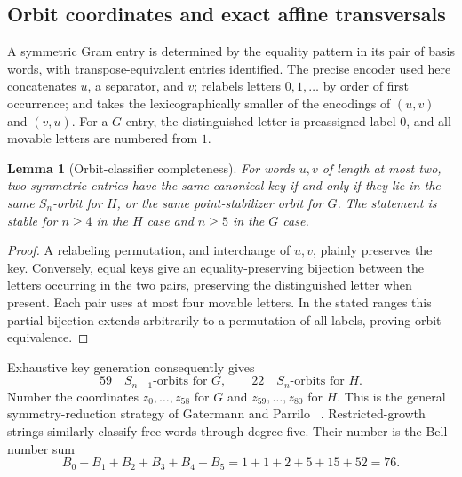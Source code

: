 \documentclass[11pt]{article}
\newtheorem{lemma}[theorem]{Lemma}
\begin{document}
\subsection{Orbit coordinates and exact affine transversals}

A symmetric Gram entry is determined by the equality pattern in its pair of
basis words, with transpose-equivalent entries identified.  The precise
encoder used here concatenates \(u\), a separator, and \(v\); relabels
letters \(0,1,\ldots\) by order of first occurrence; and takes the
lexicographically smaller of the encodings of \((u,v)\) and \((v,u)\).
For a \(G\)-entry, the distinguished letter is preassigned label \(0\), and
all movable letters are numbered from \(1\).

\begin{lemma}[Orbit-classifier completeness]\label{lem:orbit-classifier}
For words \(u,v\) of length at most two, two symmetric entries have the same
canonical key if and only if they lie in the same \(S_n\)-orbit for \(H\), or
the same point-stabilizer orbit for \(G\).  The statement is stable for
\(n\ge4\) in the \(H\) case and \(n\ge5\) in the \(G\) case.
\end{lemma}

\begin{proof}
A relabeling permutation, and interchange of \(u,v\), plainly preserves the
key.  Conversely, equal keys give an equality-preserving bijection between
the letters occurring in the two pairs, preserving the distinguished letter
when present.  Each pair uses at most four movable letters.  In the stated
ranges this partial bijection extends arbitrarily to a permutation of all
labels, proving orbit equivalence.
\end{proof}

Exhaustive key generation consequently gives
\[
 59\quad S_{n-1}\text{-orbits for }G,
 \qquad
 22\quad S_n\text{-orbits for }H.
\]
Number the coordinates \(z_0,\ldots,z_{58}\) for \(G\) and
\(z_{59},\ldots,z_{80}\) for \(H\).  This is the general
symmetry-reduction strategy of Gatermann and Parrilo
~\cite{GatermannParrilo2004}.  Restricted-growth strings similarly classify
free words through degree five.  Their number is the Bell-number sum
\[
 B_0+B_1+B_2+B_3+B_4+B_5=1+1+2+5+15+52=76.
\]
\end{document}
